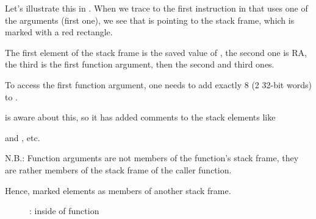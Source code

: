\myindex{\olly}
Let's illustrate this in \olly.
When we trace to the first instruction in \ttf that uses one of the arguments 
(first one), we see that \EBP is pointing to the \gls{stack frame}, 
which is marked with a red rectangle.

The first element of the \gls{stack frame} is the saved value of \EBP, 
the second one is \ac{RA}, the third is the first function argument, then the second and third ones.

To access the first function argument, one needs to add exactly 8 (2 32-bit words) to \EBP.

\olly is aware about this, so it has added comments to the stack elements like

 and , etc.

N.B.: Function arguments are not members of the function's stack frame, they are rather
members of the stack frame of the \gls{caller} function.

Hence, \olly marked  elements as members of another stack frame.

\begin{figure}[H]
\centering
{}
\caption{\olly: inside of \ttf{} function}
\label{fig:passing_arguments_olly}
\end{figure}

